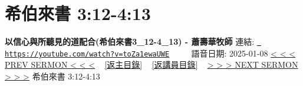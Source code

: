 \documentclass{book}
\begin{document}
\section{希伯來書 3:12-4:13}
\label{sec:toZa1ewaUWE}
\textbf{以信心與所聽見的道配合(希伯來書3\_12-4\_13) - 蕭壽華牧師}
\newline
\newline
連結: \href{https://youtube.com/watch?v=toZa1ewaUWE}{\texttt{ https://youtube.com/watch?v=toZa1ewaUWE}} ~~~~ 語音日期: 2025-01-08 
\newline
\newline
\hyperref[sec:fJrsPMmDHtU]{< < < PREV SERMON < < <}
~
\hyperlink{toc}{[返主目錄]}
~
\hyperref[ch:preacher7]{[返講員目錄]}
~
\hyperref[sec:8LlYAk0Xlok]{> > > NEXT SERMON > > >}
\newline
\newline
希伯來書 3:12-4:13
\newline
\end{document}
